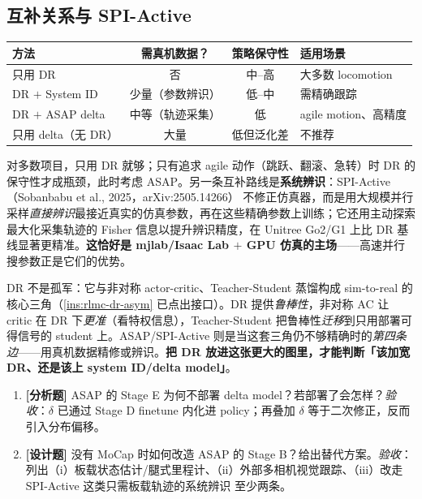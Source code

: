 \subsection{互补关系与 SPI-Active}
\label{sec:rlmc-dr-beyond-spi}

\begin{center}
\small
\begin{tabular}{@{}lccp{3.2cm}@{}}
\toprule
方法 & 需真机数据？ & 策略保守性 & 适用场景 \\
\midrule
只用 DR & 否 & 中--高 & 大多数 locomotion \\
DR $+$ System ID & 少量（参数辨识） & 低--中 & 需精确跟踪 \\
DR $+$ ASAP delta & 中等（轨迹采集） & 低 & agile motion、高精度 \\
只用 delta（无 DR） & 大量 & 低但泛化差 & 不推荐 \\
\bottomrule
\end{tabular}
\end{center}

对多数项目，只用 DR 就够；只有追求 agile 动作（跳跃、翻滚、急转）时 DR 的保守性才成瓶颈，此时考虑 ASAP。另一条互补路线是\textbf{系统辨识}：SPI-Active（Sobanbabu et al., 2025，arXiv:2505.14266）\cite{sobanbabu2025spi} 不修正仿真器，而是用大规模并行采样\emph{直接辨识}最接近真实的仿真参数，再在这些精确参数上训练；它还用主动探索最大化采集轨迹的 Fisher 信息以提升辨识精度，在 Unitree Go2/G1 上比 DR 基线显著更精准。\textbf{这恰好是 mjlab/Isaac Lab $+$ GPU 仿真的主场}——高速并行搜参数正是它们的优势。

\begin{insight}\label{ins:rlmc-dr-triangle}
DR 不是孤军：它与非对称 actor-critic、Teacher-Student 蒸馏构成 sim-to-real 的核心三角（\cref{ins:rlmc-dr-asym} 已点出接口）。DR 提供\emph{鲁棒性}，非对称 AC 让 critic 在 DR 下\emph{更准}（看特权信息），Teacher-Student 把鲁棒性\emph{迁移}到只用部署可得信号的 student 上。ASAP/SPI-Active 则是当这套三角仍不够精确时的\emph{第四条边}——用真机数据精修或辨识。\textbf{把 DR 放进这张更大的图里，才能判断「该加宽 DR、还是该上 system ID/delta model」}。
\end{insight}

\begin{practice}[本节练习]
\begin{enumerate}
  \item \textbf{[分析题]} ASAP 的 Stage E 为何不部署 delta model？若部署了会怎样？\emph{验收}：$\delta$ 已通过 Stage D finetune 内化进 policy；再叠加 $\delta$ 等于二次修正，反而引入分布偏移。
  \item \textbf{[设计题]} 没有 MoCap 时如何改造 ASAP 的 Stage B？给出替代方案。\emph{验收}：列出（i）板载状态估计/腿式里程计、（ii）外部多相机视觉跟踪、（iii）改走 SPI-Active 这类只需板载轨迹的系统辨识 至少两条。
\end{enumerate}
\end{practice}

